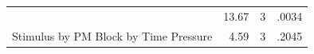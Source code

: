 \documentclass[11pt,]{article}
\begin{document}
\begin{longtable}[]{@{}lrrr@{}}
\begin{minipage}[t]{0.36\columnwidth}
\end{minipage} & \begin{minipage}[t]{0.16\columnwidth}\raggedleft\strut
13.67\strut
\end{minipage} & \begin{minipage}[t]{0.06\columnwidth}\raggedleft\strut
3\strut
\end{minipage} & \begin{minipage}[t]{0.06\columnwidth}\raggedleft\strut
.0034\strut
\end{minipage}\tabularnewline
\begin{minipage}[t]{0.36\columnwidth}\raggedright\strut
Stimulus by PM Block by Time Pressure\strut
\end{minipage} & \begin{minipage}[t]{0.16\columnwidth}\raggedleft\strut
4.59\strut
\end{minipage} & \begin{minipage}[t]{0.06\columnwidth}\raggedleft\strut
3\strut
\end{minipage} & \begin{minipage}[t]{0.06\columnwidth}\raggedleft\strut
.2045\strut
\end{minipage}\tabularnewline
\bottomrule
\end{longtable}
\end{document}
